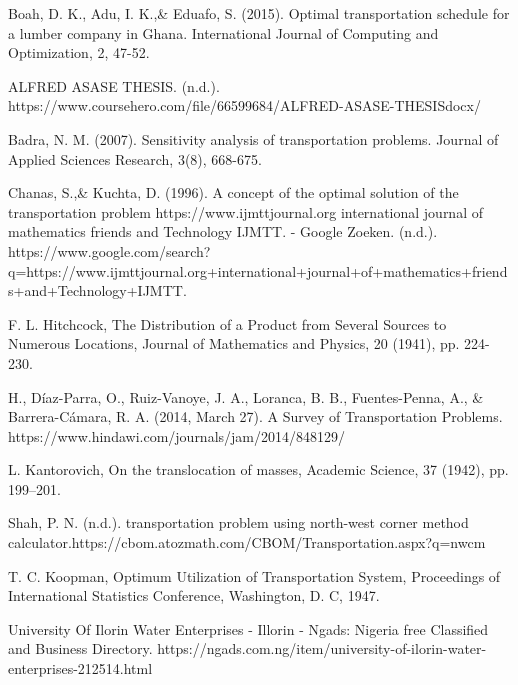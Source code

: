 \documentclass[12pt]{report}
\begin{document}
	\begin{description}
		\item 	Boah, D. K., Adu, I. K.,\& Eduafo, S. (2015). Optimal transportation schedule for a lumber company in Ghana. International Journal of Computing and Optimization, 2, 47-52.
		
		\item ALFRED ASASE THESIS. (n.d.). https://www.coursehero.com/file/66599684/ALFRED-ASASE-THESISdocx/
		
		\item Badra, N. M. (2007). Sensitivity analysis of transportation problems. Journal of Applied Sciences Research, 3(8), 668-675.
		
		\item Chanas, S.,\& Kuchta, D. (1996). A concept of the optimal solution of the transportation problem
		https://www.ijmttjournal.org international journal of mathematics friends and Technology IJMTT. - Google Zoeken. (n.d.). https://www.google.com/search?q=https://www.ijmttjournal.org+international+journal+of+mathematics+friends+and+Technology+IJMTT.

		\item F. L. Hitchcock, The Distribution of a Product from Several Sources to Numerous Locations, Journal of Mathematics and Physics, 20 (1941), pp. 224- 230.
		
		\item H., Díaz-Parra, O., Ruiz-Vanoye, J. A., Loranca, B. B., Fuentes-Penna, A., \& Barrera-Cámara, R. A. (2014, March 27). A Survey of Transportation Problems. https://www.hindawi.com/journals/jam/2014/848129/
		
		\item 	L. Kantorovich, On the translocation of masses, Academic Science, 37 (1942), pp. 199–201.
		
		\item Shah, P. N. (n.d.). transportation problem using north-west corner method calculator.https://cbom.atozmath.com/CBOM/Transportation.aspx?q=nwcm

		\item 	T. C. Koopman, Optimum Utilization of Transportation System, Proceedings of International Statistics Conference, Washington, D. C, 1947.	
		
		\item University Of Ilorin Water Enterprises - Illorin - Ngads: Nigeria free Classified and Business Directory. https://ngads.com.ng/item/university-of-ilorin-water-enterprises-212514.html

	\end{description}
	
\end{document}
